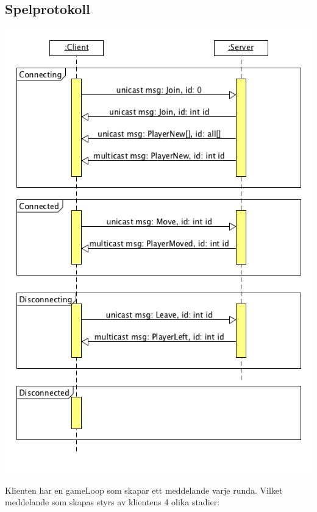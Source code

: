 \documentclass[10pt, titlepage, oneside, a4paper]{article}
\begin{document}
		\subsection{Spelprotokoll}
			\begin{center}
				\includegraphics[scale=.5]{./documentation/images/protocol.png}
			\end{center}				
			Klienten har en gameLoop som skapar ett meddelande varje runda. Vilket meddelande som skapas styrs av klientens 4 olika stadier:
\end{document}

